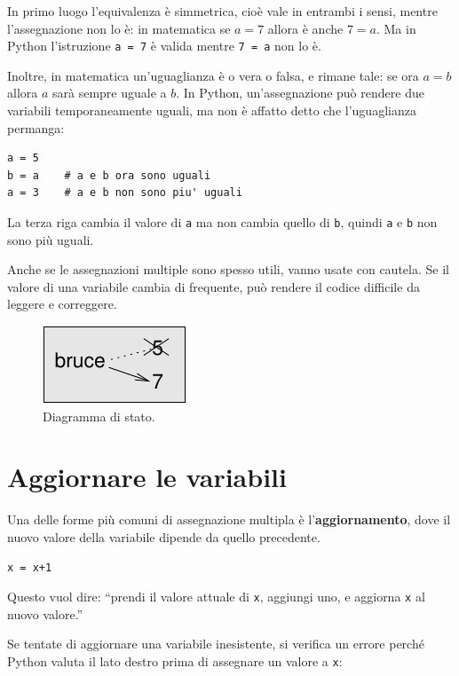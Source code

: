 \documentclass[10pt]{book}
\begin{document}
In primo luogo l'equivalenza è simmetrica, cioè vale in entrambi i sensi, mentre l'assegnazione non lo è: in matematica se $a=7$ allora è anche $7=a$. Ma in Python l'istruzione {\tt a = 7} è valida mentre {\tt 7 = a} non lo è.

Inoltre, in matematica un'uguaglianza è o vera o falsa, e rimane tale: se ora $a=b$ allora $a$ sarà sempre uguale a $b$.
In Python, un'assegnazione può rendere due variabili temporaneamente uguali, ma non è affatto detto che l'uguaglianza permanga:

\begin{verbatim}
a = 5
b = a    # a e b ora sono uguali
a = 3    # a e b non sono piu' uguali
\end{verbatim}
%
La terza riga cambia il valore di {\tt a} ma non cambia quello di {\tt b}, quindi {\tt a} e {\tt b} non sono più uguali.

Anche se le assegnazioni multiple sono spesso utili, vanno usate con cautela. Se il valore di una variabile cambia di frequente, può rendere il codice difficile da leggere e correggere.

\begin{figure}
\centerline
{\includegraphics[scale=0.8]{figs/assign2.pdf}}
\caption{Diagramma di stato.}
\label{fig.assign2}
\end{figure}



\section{Aggiornare le variabili}
\label{update}


Una delle forme più comuni di assegnazione multipla è l'{\bf aggiornamento},
dove il nuovo valore della variabile dipende da quello precedente.

\begin{verbatim}
x = x+1
\end{verbatim}
%
Questo vuol dire: ``prendi il valore attuale di {\tt x}, aggiungi uno, e aggiorna {\tt x} al nuovo valore.''

Se tentate di aggiornare una variabile inesistente, si verifica un errore perché Python valuta il lato destro prima di assegnare un valore a {\tt x}:
\end{document}
